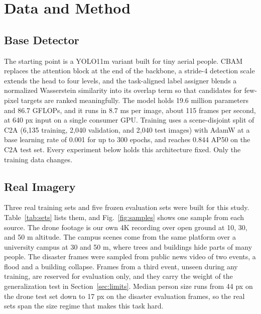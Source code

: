 \documentclass[conference,a4paper]{IEEEtran}
\begin{document}
\section{Data and Method}
\label{sec:method}

\subsection{Base Detector}
The starting point is a YOLO11m \cite{jocher2024yolo11} variant built for tiny
aerial people. CBAM \cite{woo2018cbam} replaces the attention block at the end
of the backbone, a stride-4 detection scale extends the head to four levels,
and the task-aligned label assigner blends a normalized Wasserstein similarity
\cite{wang2021nwd} into its overlap term so that candidates for few-pixel
targets are ranked meaningfully. The model holds 19.6 million parameters and
86.7 GFLOPs, and it runs in 8.7 ms per image, about 115 frames per second, at
640 px input on a single consumer GPU. Training uses a scene-disjoint split of
C2A (6,135 training, 2,040 validation, and 2,040 test images) with AdamW at a
base learning rate of 0.001 for up to 300 epochs, and reaches 0.844 AP50 on the
C2A test set. Every experiment below holds this architecture fixed. Only the
training data changes.

\subsection{Real Imagery}
Three real training sets and five frozen evaluation sets were built for this
study. Table~\ref{tab:sets} lists them, and Fig.~\ref{fig:samples} shows one
sample from each source. The drone footage is our own 4K recording over open
ground at 10, 30, and 50 m altitude. The campus scenes come from the same
platform over a university campus at 30 and 50 m, where trees and buildings
hide parts of many people. The disaster frames were sampled from public news
video of two events, a flood and a building collapse. Frames from a third
event, unseen during any training, are reserved for evaluation only, and they
carry the weight of the generalization test in Section~\ref{sec:limits}. Median
person size runs from 44 px on the drone test set down to 17 px on the disaster
evaluation frames, so the real sets span the size regime that makes this task
hard.
\end{document}
